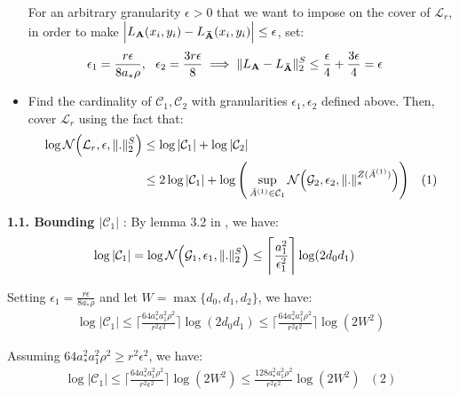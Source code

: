 \begin{itemize}
    \noindent For an arbitrary granularity $\epsilon>0$ that we want to impose on the cover of $\mathcal{L}_r$, in order to make $\Big| L_{\bf A}(x_i, y_i) - L_{\bf \bar A}(x_i, y_i) \Big| \le \epsilon$, set:
    \begin{align*}
        \epsilon_1 &= \frac{r\epsilon}{8a_*\rho}, \ \ \epsilon_2 = \frac{3r\epsilon}{8} \implies \|L_{\bf A} - L_{\bf \bar A}\|_2^S \le \frac{\epsilon}{4} + \frac{3\epsilon}{4} = \epsilon
    \end{align*}

    \item Find the cardinality of $\mathcal{C}_1, \mathcal{C}_2$ with granularities $\epsilon_1, \epsilon_2$ defined above. Then, cover $\mathcal{L}_r$ using the fact that:
    \begin{align*}
        \log\mathcal{N}\Big( \mathcal{L}_r, \epsilon, \|.\|_2^S \Big) &\le \log |\mathcal{C}_1| + \log |\mathcal{C}_2| \\
            &\le 2\log|\mathcal{C}_1| + \log\Bigg( 
                \sup_{\bar A^{(1)} \in \mathcal{C}_1} \mathcal{N}\Big( 
                    \mathcal{G}_2, \epsilon_2, \|.\|_*^{Z(\bar A^{(1)})}
                 \Big)
             \Bigg)  \ \ \ (1) 
    \end{align*}
\end{itemize}

\noindent\newline\textbf{1.1. Bounding $|\mathcal{C}_1|$} : By lemma 3.2 in \cite{article:bartlett}, we have:
\begin{align*}
    \log|\mathcal{C}_1| &= \log\mathcal{N}\Big( \mathcal{G}_1, \epsilon_1, \|.\|_2^S \Big) \le \Bigg\lceil
        \frac{a_1^2}{\epsilon_1^2}
    \Bigg\rceil\log(2d_0d_1)
\end{align*} 

\noindent Setting $\epsilon_1=\frac{r\epsilon}{8a_*\rho}$ and let $W=\max\{d_0, d_1, d_2 \}$, we have:
\begin{align*}
    \log |\mathcal{C}_1| \le \Bigg\lceil
        \frac{64a_*^2a_1^2\rho^2}{r^2\epsilon^2}
    \Bigg\rceil\log(2d_0d_1) \le 
    \Bigg\lceil
        \frac{64a_*^2a_1^2\rho^2}{r^2\epsilon^2}
    \Bigg\rceil\log(2W^2)
\end{align*}

\noindent Assuming $64a_*^2a_1^2\rho^2 \ge r^2\epsilon^2$, we have:
\begin{align*}
    \log |\mathcal{C}_1| \le \Bigg\lceil
        \frac{64a_*^2a_1^2\rho^2}{r^2\epsilon^2}
    \Bigg\rceil\log(2W^2) \le \frac{128a_*^2a_1^2\rho^2}{r^2\epsilon^2}\log(2W^2) \ \ \ (2)
\end{align*}

